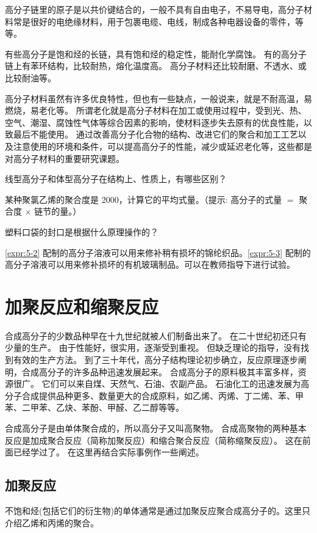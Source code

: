 高分子链里的原子是以共价键结合的，一般不具有自由电子，不易导电，高分子材料常是很好的电绝缘材料，用于包裹电缆、电线，制成各种电器设备的零件，等等。

有些高分子是饱和烃的长链，具有饱和烃的稳定性，能耐化学腐蚀。
有的高分子链上有苯环结构，比较耐热，熔化温度高。
高分子材料还比较耐磨、不透水、或比较耐油等。

高分子材料虽然有许多优良特性，但也有一些缺点，一般说来，就是不耐高温，易燃烧，易老化等。
所谓老化就是高分子材料在加工或使用过程中，受到光、热、空气、潮湿、腐蚀性气体等综合因素的影响，使材料逐步失去原有的优良性能，以致最后不能使用。
通过改善高分子化合物的结构、改进它们的聚合和加工工艺以及注意使用的环境和条件，可以提高高分子的性能，减少或延迟老化等，这些都是对高分子材料的重要研究课题。

\begin{Practice}[习题]
\begin{question}
  \item 线型高分子和体型高分子在结构上、性质上，有哪些区别？
  \item 某种聚氯乙烯的聚合度是 2000，计算它的平均式量。（提示: 高分子的式量 $=$ 聚合度 $\times$ 链节的量。）
  \item 塑料口袋的封口是根据什么原理操作的？
  \item \cref{expr:5-2} 配制的高分子溶液可以用来修补稍有损坏的锦纶织品。\cref{expr:5-3} 配制的高分子溶液可以用来修补损坏的有机玻璃制品。可以在教师指导下进行试验。
\end{question}
\end{Practice}

\section{加聚反应和缩聚反应}
合成高分子的少数品种早在十九世纪就被人们制备出来了。
在二十世纪初还只有少量的生产。
由于性能好，很实用，逐渐受到重视。
但缺乏理论的指导，没有找到有效的生产方法。
到了三十年代，高分子结构理论初步确立，反应原理逐步阐明，合成高分子的许多品种迅速发展起来。
合成高分子的原料极其丰富多样，资源很广。
它们可以来自煤、天然气、石油、农副产品。
石油化工的迅速发展为高分子合成提供品种更多、数量更大的合成原料，如乙烯、丙烯、丁二烯、苯、甲苯、二甲苯、乙炔、苯酚、甲醛、乙二醇等等。

合成高分子是由单体聚合成的，所以高分子又叫高聚物。
合成高聚物的两种基本反应是加成聚合反应（简称加聚反应）和缩合聚合反应（简称缩聚反应）。
这在前面已经学过了。
在这里再结合实际事例作一些阐述。

\subsection{加聚反应}
不饱和烃(包括它们的衍生物)的单体通常是通过加聚反应聚合成高分子的。这里只介绍乙烯和丙烯的聚合。

